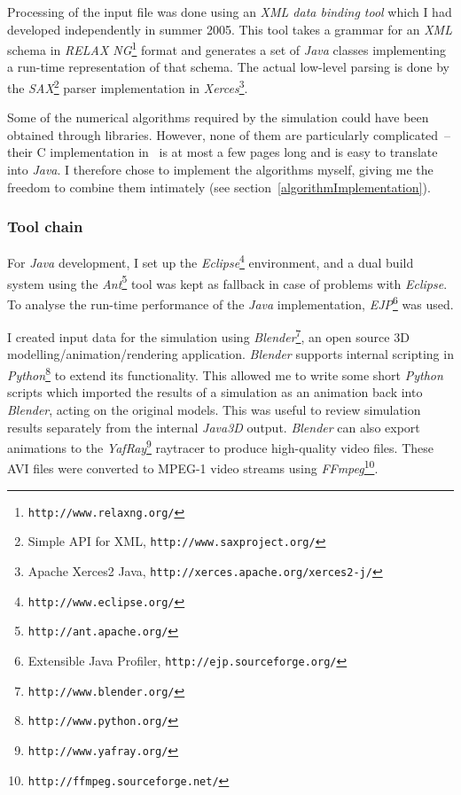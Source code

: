 Processing of the input file was done using an \textsl{XML data binding tool} which I had
developed independently in summer 2005. This tool takes a grammar for an \textsl{XML} schema in
\textsl{RELAX NG}\footnote{\texttt{http://www.relaxng.org/}} format and generates a set of
\textsl{Java} classes implementing a run-time representation of that schema. The actual low-level parsing
is done by the \textsl{SAX}\footnote{Simple API for XML, \texttt{http://www.saxproject.org/}}
parser implementation in \textsl{Xerces}\footnote{Apache Xerces2 Java,
\texttt{http://xerces.apache.org/xerces2-j/}}.

Some of the numerical algorithms required by the simulation could have been obtained through
libraries. However, none of them are particularly complicated~-- their C implementation
in~\cite{NRinC} is at most a few pages long and is easy to translate into \textsl{Java}. I
therefore chose to implement the algorithms myself, giving me the freedom to combine them
intimately (see section~\ref{algorithmImplementation}).

\subsubsection{Tool chain}
For \textsl{Java} development, I set up the \textsl{Eclipse}\footnote{\texttt{http://www.eclipse.org/}}
environment, and a dual build system using the \textsl{Ant}\footnote{\texttt{http://ant.apache.org/}}
tool was kept as fallback in case of problems with \textsl{Eclipse}. To analyse the run-time
performance of the \textsl{Java} implementation,
\textsl{EJP}\footnote{Extensible Java Profiler, \texttt{http://ejp.sourceforge.org/}} was used.

I created input data for the simulation using \textsl{Blender}\footnote{\texttt{http://www.blender.org/}},
an open source 3D modelling/animation/rendering application. \textsl{Blender} supports internal
scripting in \textsl{Python}\footnote{\texttt{http://www.python.org/}} to extend its functionality.
This allowed me to write some short \textsl{Python} scripts which imported the results of a
simulation as an animation back into \textsl{Blender}, acting on the original models. This was useful
to review simulation results separately from the internal \textsl{Java3D} output. \textsl{Blender}
can also export animations to the \textsl{YafRay}\footnote{\texttt{http://www.yafray.org/}}
raytracer to produce high-quality video files. These AVI files were converted to MPEG-1 video
streams using \textsl{FFmpeg}\footnote{\texttt{http://ffmpeg.sourceforge.net/}}.


